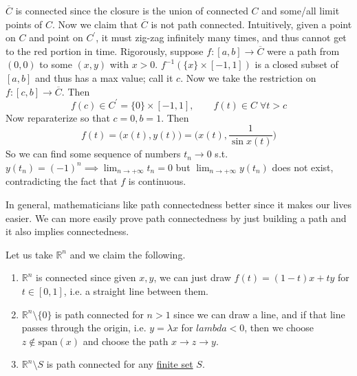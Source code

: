 \begin{example}
    $\overline{C}$ is connected since the closure is the union of connected $C$ and some/all limit points of $C$. Now we claim that $\overline{C}$ is not path connected. Intuitively, given a point on $C$ and point on $C^\prime$, it must zig-zag infinitely many times, and thus cannot get to the red portion in time. Rigorously, suppose $f: [a, b] \rightarrow \overline{C}$ were a path from $(0, 0)$ to some $(x, y)$ with $x > 0$. $f^{-1} (\{x\} \times [-1, 1])$ is a closed subset of $[a, b]$ and thus has a max value; call it $c$. Now we take the restriction on $f: [c, b] \rightarrow \overline{C}$. Then 
    \begin{equation}
      f(c) \in C^\prime = \{0\} \times [-1, 1], \qquad f(t) \in C \; \forall t > c
    \end{equation} 
    Now reparaterize so that $c = 0, b = 1$. Then 
    \begin{equation}
      f(t) = \big( x(t), y(t) \big) = \big( x(t), \frac{1}{\sin{x(t)}} \big) 
    \end{equation}
    So we can find some sequence of numbers $t_n \rightarrow 0$ s.t. $y(t_n) = (-1)^n \implies \lim_{n \rightarrow +\infty} t_n = 0$ but $\lim_{n \rightarrow +\infty} y(t_n)$ does not exist, contradicting the fact that $f$ is continuous. 
  \end{example} 

  In general, mathematicians like path connectedness better since it makes our lives easier. We can more easily prove path connectedness by just building a path and it also implies connectedness.  

  \begin{example}
    \label{ex:euclidean-space}
    Let us take $\mathbb{R}^n$ and we claim the following. 
    \begin{enumerate}
      \item $\mathbb{R}^n$ is connected since given $x, y$, we can just draw $f(t) = (1 - t) x + ty$ for $t \in [0, 1]$, i.e. a straight line between them. 
      \item $\mathbb{R}^n \setminus \{0\}$ is path connected for $n > 1$ since we can draw a line, and if that line passes through the origin, i.e. $y = \lambda x$ for $lambda < 0$, then we choose $z \not\in \mathrm{span}(x)$ and choose the path $x \rightarrow z \rightarrow y$. 
      \item $\mathbb{R}^n \setminus S$ is path connected for any \hyperref[st-def:finite-set]{finite set} $S$. 
    \end{enumerate}
  \end{example} 

